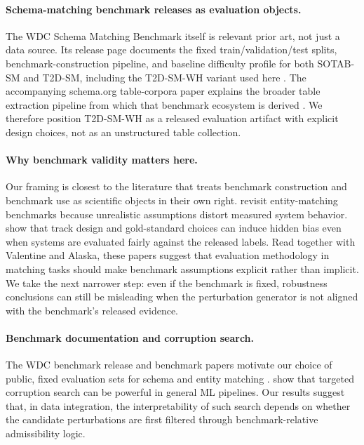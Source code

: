 \documentclass{article}
\begin{document}
\paragraph{Schema-matching benchmark releases as evaluation objects.}
The WDC Schema Matching Benchmark itself is relevant prior art, not just a data source. Its release page documents the fixed train/validation/test splits, benchmark-construction pipeline, and baseline difficulty profile for both SOTAB-SM and T2D-SM, including the T2D-SM-WH variant used here \citep{der2023wdcsmb}. The accompanying schema.org table-corpora paper explains the broader table extraction pipeline from which that benchmark ecosystem is derived \citep{peeters2024schemaorgtables}. We therefore position T2D-SM-WH as a released evaluation artifact with explicit design choices, not as an unstructured table collection.

\paragraph{Why benchmark validity matters here.}
Our framing is closest to the literature that treats benchmark construction and benchmark use as scientific objects in their own right. \citet{wang2022bridging} revisit entity-matching benchmarks because unrealistic assumptions distort measured system behavior. \citet{hertling2020oaei} show that track design and gold-standard choices can induce hidden bias even when systems are evaluated fairly against the released labels. Read together with Valentine and Alaska, these papers suggest that evaluation methodology in matching tasks should make benchmark assumptions explicit rather than implicit. We take the next narrower step: even if the benchmark is fixed, robustness conclusions can still be misleading when the perturbation generator is not aligned with the benchmark's released evidence.

\paragraph{Benchmark documentation and corruption search.}
The WDC benchmark release and benchmark papers motivate our choice of public, fixed evaluation sets for schema and entity matching \citep{der2023wdcsmb,peeters2024schemaorgtables,peeters2024wdcproducts}. \citet{zhu2025savage} show that targeted corruption search can be powerful in general ML pipelines. Our results suggest that, in data integration, the interpretability of such search depends on whether the candidate perturbations are first filtered through benchmark-relative admissibility logic.
\end{document}
